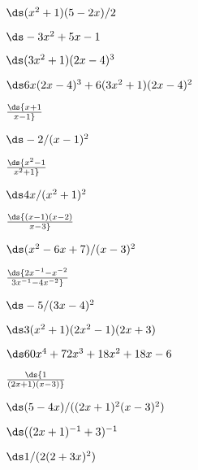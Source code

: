 \begin{exercises}
\begin{exercise} $\ds (x^2+1)(5-2x)/2$
\begin{answer} $\ds -3x^2+5x-1$
\end{answer}\end{exercise}

\begin{exercise} $\ds (3x^2+1)(2x-4)^3$
\begin{answer} $\ds 6x(2x-4)^3+6(3x^2+1)(2x-4)^2$
\end{answer}\end{exercise}

\begin{exercise} $\ds{x+1\over x-1}$
\begin{answer} $\ds -2/(x-1)^2$
\end{answer}\end{exercise}

\begin{exercise} $\ds{x^2-1\over x^2+1}$
\begin{answer} $\ds 4x/(x^2+1)^2$
\end{answer}\end{exercise}

\begin{exercise} $\ds{(x-1)(x-2)\over x-3}$
\begin{answer} $\ds (x^2-6x+7)/(x-3)^2$
\end{answer}\end{exercise}

\begin{exercise} $\ds{2x^{-1}-x^{-2}\over 3x^{-1}-4x^{-2}}$
\begin{answer} $\ds -5/(3x-4)^2$
\end{answer}\end{exercise}

\begin{exercise} $\ds 3(x^2+1)(2x^2-1)(2x+3)$
\begin{answer} $\ds 60x^4+72x^3+18x^2+18x-6$
\end{answer}\end{exercise}

\begin{exercise} $\ds{1\over (2x+1)(x-3)}$
\begin{answer} $\ds (5-4x)/((2x+1)^2(x-3)^2)$
\end{answer}\end{exercise}

\begin{exercise} $\ds ((2x+1)^{-1}+3)^{-1}$
\begin{answer} $\ds 1/(2(2+3x)^2)$
\end{answer}\end{exercise}


\end{exercises}
